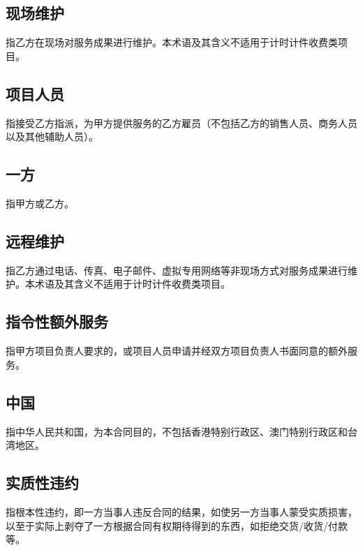 \subsection{现场维护}
指乙方在现场对服务成果进行维护。本术语及其含义不适用于计时计件收费类项目。

\subsection{项目人员}
指接受乙方指派，为甲方提供服务的乙方雇员（不包括乙方的销售人员、商务人员以及其他辅助人员）。

\subsection{一方}
指甲方或乙方。

\subsection{远程维护}
指乙方通过电话、传真、电子邮件、虚拟专用网络等非现场方式对服务成果进行维护。本术语及其含义不适用于计时计件收费类项目。

\subsection{指令性额外服务}
指甲方项目负责人要求的，或项目人员申请并经双方项目负责人书面同意的额外服务。

\subsection{中国}
指中华人民共和国，为本合同目的，不包括香港特别行政区、澳门特别行政区和台湾地区。

\subsection{实质性违约}
指根本性违约，即一方当事人违反合同的结果，如使另一方当事人蒙受实质损害，以至于实际上剥夺了一方根据合同有权期待得到的东西，如拒绝交货/收货/付款等。

